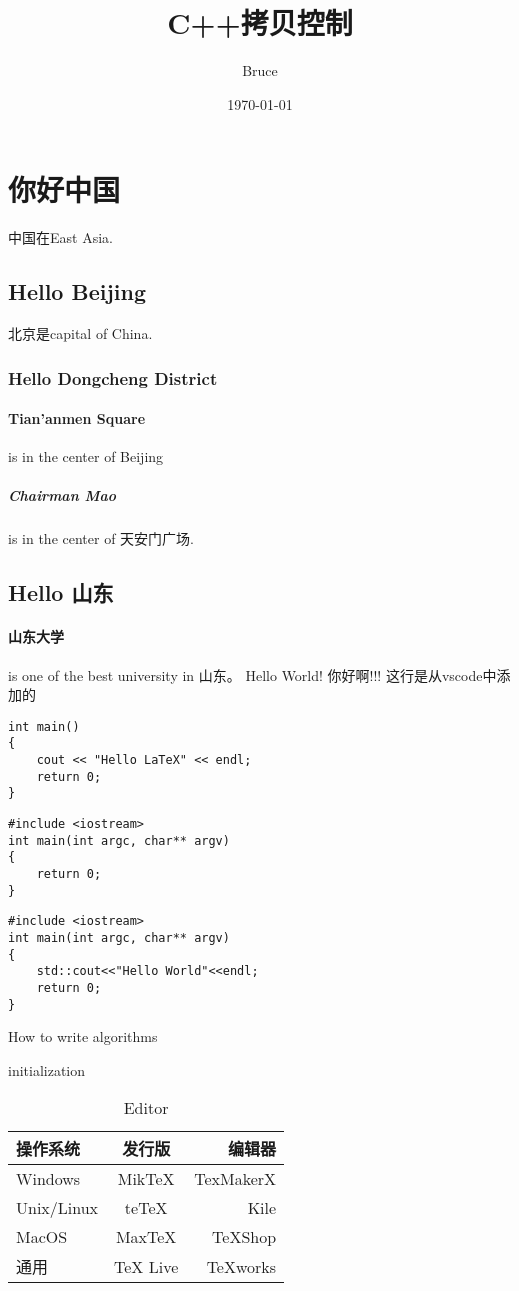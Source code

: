 \documentclass[UTF8]{ctexart}
\title{C++拷贝控制}
\author{Bruce}
\date{\today}
\begin{document}
\maketitle
\tableofcontents

\section{你好中国}
中国在East Asia.
\subsection{Hello Beijing}
北京是capital of China.
\subsubsection{Hello Dongcheng District}
\paragraph{Tian'anmen Square}
is in the center of Beijing
\subparagraph{Chairman Mao}
is in the center of 天安门广场.
\subsection{Hello 山东}
\paragraph{山东大学} is one of the best university in 山东。\newline
Hello World! 你好啊!!!
这行是从vscode中添加的


\begin{verbatim}
int main()
{
    cout << "Hello LaTeX" << endl;
    return 0;
}
\end{verbatim}

\begin{lstlisting}[caption= hello world]
#include <iostream>
int main(int argc, char** argv)
{
    return 0;
}
\end{lstlisting}


\begin{verbatim}
#include <iostream>
int main(int argc, char** argv)
{
    std::cout<<"Hello World"<<endl;
    return 0;
}
\end{verbatim}

\begin{algorithm}[H]
\caption{How to write algorithms}
initialization\;

\end{algorithm}

\begin{table}[htbp]
\centering
\begin{tabular}{|l|c|r|}
\hline
操作系统 & 发行版 & 编辑器\\
\hline
Windows & MikTeX & TexMakerX \\
\hline
Unix/Linux & teTeX & Kile \\
\hline
MacOS  & MaxTeX  & TeXShop \\
\hline
通用 & TeX Live & TeXworks \\
\hline
\end{tabular}
\caption{Editor}
\label{tbl:editor}
\end{table}
\end{document}
